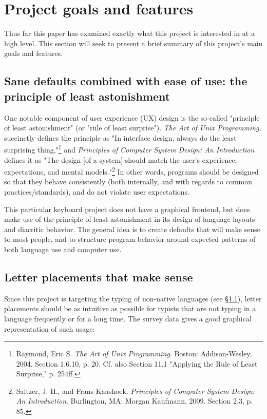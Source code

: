 \documentclass[11pt]{article}
\begin{document}
\section{Project goals and features}
\label{sec:org5623cd4}

Thus far this paper has examined exactly what this project is interested in at a high level. This section will seek to present a brief summary of this project's main goals and features.

\subsection{Sane defaults combined with ease of use: the principle of least astonishment}
\label{sec:orgd2ef37c}

One notable component of user experience (UX) design is the so-called "principle of least astonishment" (or "rule of least surprise"). \emph{The Art of Unix Programming}, succinctly defines the principle as "In interface design, always do the least surprising thing,"\footnote{Raymond, Eric S. \emph{The Art of Unix Programming}. Boston: Addison-Wesley, 2004. Section 1.6.10, p. 20. Cf. also Section 11.1 "Applying the Rule of Least Surprise," p. 254ff.} and \emph{Principles of Computer System Design: An Introduction} defines it as "The design [of a system] should match the user's experience, expectations, and mental models."\footnote{Saltzer, J. H., and Frans Kaashoek. \emph{Principles of Computer System Design: An Introduction}. Burlington, MA: Morgan Kaufmann, 2009. Section 2.3, p. 85.} In other words, programs should be designed so that they behave consistently (both internally, and with regards to common practices/standards), and do not violate user expectations.

This particular keyboard project does not have a graphical frontend, but does make use of the principle of least astonishment in its design of language layouts and diacritic behavior. The general idea is to create defaults that will make sense to most people, and to structure program behavior around expected patterns of both language use and computer use.

\subsection{Letter placements that make sense}
\label{sec:org80c6834}

Since this project is targeting the typing of non-native languages (see \hyperref[sec:org242a507]{§1.1}), letter placements should be as intuitive as possible for typists that are not typing in a language frequently or for a long time. The survey data gives a good graphical representation of such usage:
\end{document}
